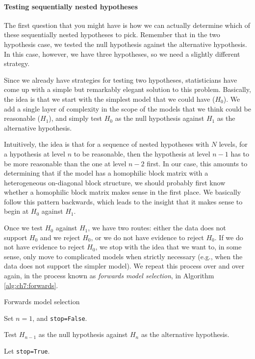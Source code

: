 \paragraph*{Testing sequentially nested hypotheses}

The first question that you might have is how we can actually determine which of these sequentially nested hypotheses to pick. Remember that in the two hypothesis case, we tested the null hypothesis against the alternative hypothesis. In this case, however, we have three hypotheses, so we need a slightly different strategy. 

Since we already have strategies for testing two hypotheses, statisticians have come up with a simple but remarkably elegant solution to this problem. Basically, the idea is that we start with the simplest model that we could have ($H_0$). We add a single layer of complexity in the scope of the models that we think could be reasonable ($H_1$), and simply test $H_0$ as the null hypothesis against $H_1$ as the alternative hypothesis. 

Intuitively, the idea is that for a sequence of nested hypotheses with $N$ levels, for a hypothesis at level $n$ to be reasonable, then the hypothesis at level $n-1$ has to be more reasonable than the one at level $n-2$ first. In our case, this amounts to determining that if the model has a homophilic block matrix with a heterogeneous on-diagonal block structure, we should probably first know whether a homophilic block matrix makes sense in the first place. We basically follow this pattern backwards, which leads to the insight that it makes sense to begin at $H_0$ against $H_1$.

Once we test $H_0$ against $H_1$, we have two routes: either the data does not support $H_0$ and we reject $H_0$, or we do not have evidence to reject $H_0$. If we do not have evidence to reject $H_0$, we stop with the idea that we want to, in some sense, only move to complicated models when strictly necessary (e.g., when the data does not support the simpler model). We repeat this process over and over again, in the process known as \textit{forwards model selection}, in Algorithm \ref{alg:ch7:forwards}.

\begin{algorithm}[h]\caption{Forwards model selection}
\label{alg:ch7:forwards}
\SetAlgoLined

Set $n = 1$, and \texttt{stop=False}.

 {
    
    Test $H_{n-1}$ as the null hypothesis against $H_n$ as the alternative hypothesis. 
    
     {
        Let \texttt{stop=True}.
    } 
}

\end{algorithm}

